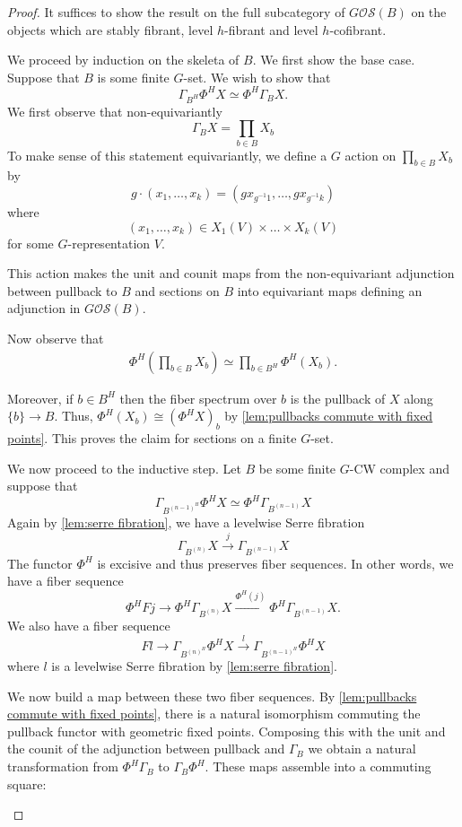 \documentclass[11pt]{amsart}
\newcommand{\Osp}{\mathcal{OS}}
\theoremstyle{plain}   %
\theoremstyle{definition}
\theoremstyle{remark}
\numberwithin{equation}{section}
\begin{document}
\begin{proof}
It suffices to show the result on the full subcategory of $G\Osp(B)$ on the objects which are stably fibrant, level $h$-fibrant and level $h$-cofibrant.

We proceed by induction on the skeleta of $B$. We first show the base case. Suppose that $B$ is some finite $G$-set. We wish to show that
\[
\Gamma_{B^H}\Phi^HX  \simeq \Phi^H \Gamma_B X.
\]
We first observe that non-equivariantly
\[
\Gamma_BX = \prod_{b\in B} X_b
\]
To make sense of this statement equivariantly, we define a $G$ action on $\prod_{b\in B} X_b$ by 
\[
g\cdot(x_1,\dots,x_k)  = (gx_{g^{-1}1},\dots,gx_{g^{-1}k})
\]
where 
\[
(x_1,\dots,x_k) \in X_1(V)\times\dots\times X_k(V)
\]
for some $G$-representation $V$. 

This action makes the unit and counit maps from the non-equivariant adjunction between pullback to $B$ and sections on $B$ into equivariant maps defining an adjunction in   $G\Osp(B)$. 

Now observe that  
\begin{align*}
\Phi^H\left(\prod_{b\in B} X_b\right) \simeq \prod_{b\in B^H} \Phi^H(X_b).
\end{align*}

Moreover, if $b\in B^H$ then the fiber spectrum over $b$ is the pullback of $X$ along $\{b\}\to B$. Thus, $\Phi^H(X_b)\cong (\Phi^H X)_b$ by \cref{lem:pullbacks commute with fixed points}. This proves the claim for sections on a finite $G$-set.

We now proceed to the inductive step. Let $B$ be some finite $G$-CW complex and suppose that 
\[
\Gamma_{B^{(n-1)^H}} \Phi^H X \simeq \Phi^H \Gamma_{B^{(n-1)}} X
\]
Again by \cref{lem:serre fibration}, we have a levelwise Serre fibration
\[
\Gamma_{B^{(n)}} X\xrightarrow{j}\Gamma_{B^{(n-1)}}X 
\]
The functor $\Phi^H$ is excisive \cite{alaska} and thus preserves fiber sequences. In other words, we have a fiber sequence
\[
\Phi^H Fj\to \Phi^H\Gamma_{B^{(n)}}X\xrightarrow{\Phi^H (j)}\Phi^H \Gamma_{B^{(n-1)}}X.
\]
We also have a fiber sequence
\[
Fl\to\Gamma_{B^{(n)^H}}\Phi^HX \xrightarrow{l}\Gamma_{B^{(n-1)^H}}\Phi^HX
\]
where $l$ is a levelwise Serre fibration by \cref{lem:serre fibration}. 

We now build a map between these two fiber sequences. By \cref{lem:pullbacks commute with fixed points}, there is a natural isomorphism commuting the pullback functor with geometric fixed points. Composing this with the unit and the counit of the adjunction between pullback and $ \Gamma_B$ we obtain a natural transformation from $\Phi^H\Gamma_B$ to $\Gamma_B\Phi^H$. These maps assemble into a commuting square:
\begin{figure}[H]
\center
{}
\end{figure}


\end{proof}
\end{document}
